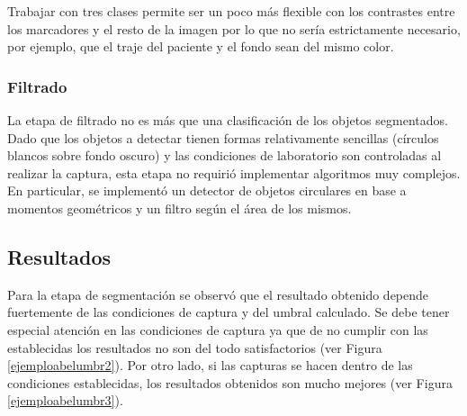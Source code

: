 Trabajar con tres clases permite ser un poco más flexible con los contrastes entre los marcadores y el resto de la imagen por lo que no sería estrictamente necesario, por ejemplo, que el traje del paciente y el fondo sean del mismo color.

\subsubsection{Filtrado}
La etapa de filtrado no es más que una clasificación de los objetos segmentados. Dado que los objetos a detectar tienen formas relativamente sencillas (círculos blancos sobre fondo oscuro) y las condiciones de laboratorio son controladas al realizar la captura, esta etapa no requirió implementar algoritmos muy complejos. En particular, se implementó un detector de objetos circulares en base a momentos geométricos\cite{imageMoments} y un filtro según el área de los mismos.

\subsection{Resultados}
Para la etapa de segmentación se observó que el resultado obtenido depende fuertemente de las condiciones de captura y del umbral calculado. Se debe tener especial atención en las condiciones de captura ya que de no cumplir con las establecidas los resultados no son del todo satisfactorios (ver Figura \ref{ejemploabelumbr2}). Por otro lado, si las capturas se hacen dentro de las condiciones establecidas, los resultados obtenidos son mucho mejores (ver Figura \ref{ejemploabelumbr3}).

